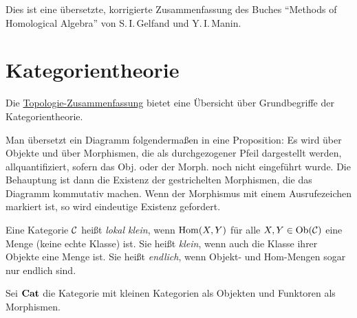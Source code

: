 \documentclass{cheat-sheet}
\begin{document}

Dies ist eine übersetzte, korrigierte Zusammenfassung des Buches "`Methods of Homological Algebra"' von S.\,I.\,Gelfand und Y.\,I.\,Manin.




\section{Kategorientheorie}

\begin{bem}
  Die \href{http://timbaumann.info/uni-spicker/topo.pdf}{Topologie-Zusammenfassung} bietet eine Übersicht über Grundbegriffe der Kategorientheorie.
\end{bem}

\begin{konv}
  Man übersetzt ein Diagramm folgendermaßen in eine Proposition:
  Es wird über Objekte und über Morphismen, die als durchgezogener Pfeil dargestellt werden, allquantifiziert, sofern das Obj. oder der Morph. noch nicht eingeführt wurde.
  Die Behauptung ist dann die Existenz der gestrichelten Morphismen, die das Diagramm kommutativ machen. Wenn der Morphismus mit einem Ausrufezeichen markiert ist, so wird eindeutige Existenz gefordert.
\end{konv}

\begin{defn}
  Eine Kategorie $\mathcal{C}$ heißt \emph{lokal klein}, wenn $\operatorname{Hom}(X, Y)$ für alle $X, Y \in \operatorname{Ob}(\mathcal{C})$ eine Menge (keine echte Klasse) ist.
  Sie heißt \emph{klein}, wenn auch die Klasse ihrer Objekte eine Menge ist.
  Sie heißt \emph{endlich}, wenn Objekt- und Hom-Mengen sogar nur endlich sind.
\end{defn}

\begin{defn}
  Sei $\mathbf{Cat}$ die Kategorie mit kleinen Kategorien als Objekten und Funktoren als Morphismen.
\end{defn}

\end{document}
